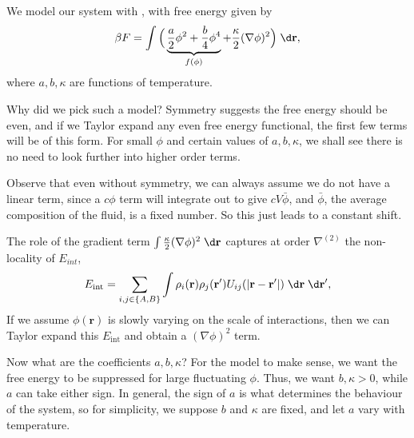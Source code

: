 \documentclass[a4paper]{article}
\begin{document}
We model our system with , with free energy given by
\[
  \beta F = \int \Big(\underbrace{\frac{a}{2} \phi^2 + \frac{b}{4} \phi^4}_{f(\phi)} + \frac{\kappa}{2} (\nabla \phi)^2\Big)\;\d \mathbf{r},
\]
where $a, b, \kappa$ are functions of temperature.

Why did we pick such a model? Symmetry suggests the free energy should be even, and if we Taylor expand any even free energy functional, the first few terms will be of this form. For small $\phi$ and certain values of $a, b, \kappa$, we shall see there is no need to look further into higher order terms.

Observe that even without symmetry, we can always assume we do not have a linear term, since a $c \phi$ term will integrate out to give $cV \bar{\phi}$, and $\bar{\phi}$, the average composition of the fluid, is a fixed number. So this just leads to a constant shift.

The role of the gradient term $\int \frac{\kappa}{2} (\nabla \phi)^2 \;\d \mathbf{r}$ captures at order $\nabla^{(2)}$ the non-locality of $E_{int}$,
\[
  E_{\mathrm{int}} = \sum_{i, j \in \{A, B\}} \int \rho_i (\mathbf{r}) \rho_j(\mathbf{r}') U_{ij}(|\mathbf{r} - \mathbf{r}'|)\;\d \mathbf{r}\;\d \mathbf{r}',
\]
If we assume $\phi(\mathbf{r})$ is slowly varying on the scale of interactions, then we can Taylor expand this $E_{\mathrm{int}}$ and obtain a $(\nabla \phi)^2$ term.

Now what are the coefficients $a, b, \kappa$? For the model to make sense, we want the free energy to be suppressed for large fluctuating $\phi$. Thus, we want $b, \kappa > 0$, while $a$ can take either sign. In general, the sign of $a$ is what determines the behaviour of the system, so for simplicity, we suppose $b$ and $\kappa$ are fixed, and let $a$ vary with temperature.
\end{document}
